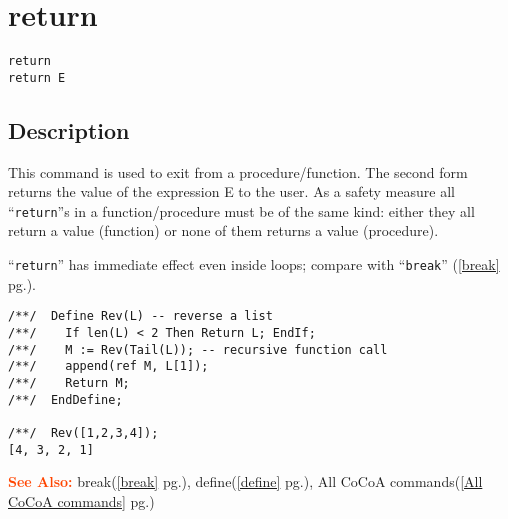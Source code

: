 \documentclass[a4paper]{mybook}
\newenvironment{command}{}{} %
\newcommand\SeeAlso{\par\textcolor{OrangeRed}{\textbf{\large See Also: }}}
\begin{document}
\section{return}
\label{return}
\begin{command} %


\begin{Verbatim}[label=syntax, rulecolor=\color{MidnightBlue},
frame=single]
return
return E
\end{Verbatim}


\subsection*{Description}

This command is used to exit from a procedure/function.  The
second form returns the value of the expression E to the user.
As a safety measure all ``\verb&return&''s in a function/procedure must
be of the same kind: either they all return a value (function)
or none of them returns a value (procedure).

``\verb&return&'' has immediate effect even inside loops; compare with ``\verb&break&'' (\ref{break} pg.\pageref{break}).
\begin{Verbatim}[label=example, rulecolor=\color{PineGreen}, frame=single]
/**/  Define Rev(L) -- reverse a list
/**/    If len(L) < 2 Then Return L; EndIf;
/**/    M := Rev(Tail(L)); -- recursive function call
/**/    append(ref M, L[1]);
/**/    Return M;
/**/  EndDefine;

/**/  Rev([1,2,3,4]);
[4, 3, 2, 1]
\end{Verbatim}


\SeeAlso %
  break(\ref{break} pg.\pageref{break}), 
    define(\ref{define} pg.\pageref{define}), 
    All CoCoA commands(\ref{All CoCoA commands} pg.\pageref{All CoCoA commands})
\end{command} %
\end{document}
